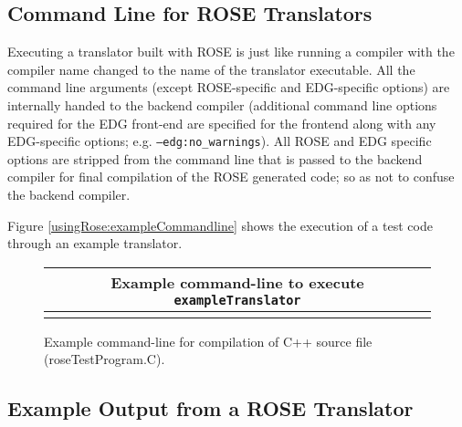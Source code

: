 \subsection{Command Line for ROSE Translators}
\label{usingRose:commandline}

  Executing a translator built with ROSE is just like running a compiler
with the compiler name changed to the name of the translator executable.
All the command line arguments (except ROSE-specific and EDG-specific options) 
are internally handed to the backend compiler (additional command line options 
required for the EDG front-end are specified for the frontend along with any 
EDG-specific options; e.g. {\tt --edg:no\_warnings}). All ROSE and EDG specific 
options are stripped from the command line that is passed to the backend compiler 
for final compilation of the ROSE generated code; so as not to confuse the backend
compiler.

Figure \ref{usingRose:exampleCommandline} shows the execution of a test code through an example translator.

{\indent
{\mySmallFontSize

\begin{latexonly}
\begin{figure}[tb]
\begin{center}
\begin{tabular}{|c|} \hline
     Example command-line to execute {\tt exampleTranslator}
\\\hline\hline

\\\hline
\end{tabular}
\end{center}
\caption{ Example command-line for compilation of C++ source file (roseTestProgram.C). }
\end{figure}
\end{latexonly}

\begin{htmlonly}
   
\end{htmlonly}

\label{usingRose:exampleCommandline}

}
}

\subsection{Example Output from a ROSE Translator}
\label{usingRose:executableOutput}

